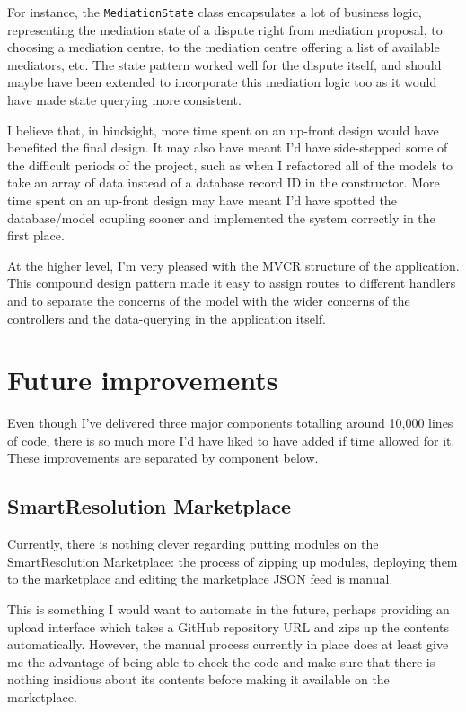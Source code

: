 For instance, the \lstinline{MediationState} class encapsulates a lot of business logic, representing the mediation state of a dispute right from mediation proposal, to choosing a mediation centre, to the mediation centre offering a list of available mediators, etc. The state pattern worked well for the dispute itself, and should maybe have been extended to incorporate this mediation logic too as it would have made state querying more consistent.

I believe that, in hindsight, more time spent on an up-front design would have benefited the final design. It may also have meant I'd have side-stepped some of the difficult periods of the project, such as when I refactored all of the models to take an array of data instead of a database record ID in the constructor. More time spent on an up-front design may have meant I'd have spotted the database/model coupling sooner and implemented the system correctly in the first place.

At the higher level, I'm very pleased with the MVCR structure of the application. This compound design pattern made it easy to assign routes to different handlers and to separate the concerns of the model with the wider concerns of the controllers and the data-querying in the application itself.

\section{Future improvements}

Even though I've delivered three major components totalling around 10,000 lines of code, there is so much more I'd have liked to have added if time allowed for it. These improvements are separated by component below.

\subsection{SmartResolution Marketplace}

Currently, there is nothing clever regarding putting modules on the SmartResolution Marketplace: the process of zipping up modules, deploying them to the marketplace and editing the marketplace JSON feed is manual.

This is something I would want to automate in the future, perhaps providing an upload interface which takes a GitHub repository URL and zips up the contents automatically. However, the manual process currently in place does at least give me the advantage of being able to check the code and make sure that there is nothing insidious about its contents before making it available on the marketplace.

